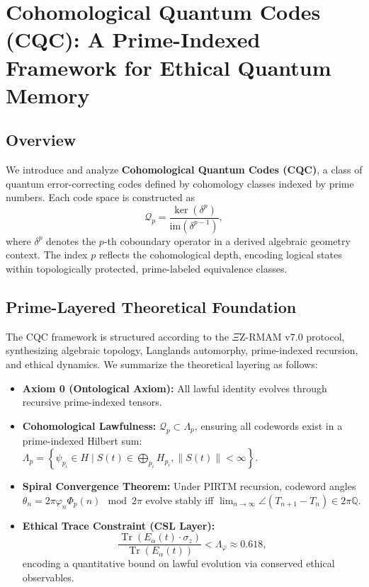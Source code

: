 \documentclass[12]{amsart}
\theoremstyle{plain}
\begin{document}
\section{Cohomological Quantum Codes (CQC): A Prime-Indexed Framework for Ethical Quantum Memory}

\subsection{Overview}
We introduce and analyze \textbf{Cohomological Quantum Codes (CQC)}, a class of quantum error-correcting codes defined by cohomology classes indexed by prime numbers. Each code space is constructed as
\[
\mathcal{Q}_p = \frac{\ker(\delta^p)}{\mathrm{im}(\delta^{p-1})},
\]
where $\delta^p$ denotes the $p$-th coboundary operator in a derived algebraic geometry context. The index $p$ reflects the cohomological depth, encoding logical states within topologically protected, prime-labeled equivalence classes.

\subsection{Prime-Layered Theoretical Foundation}
The CQC framework is structured according to the $\Xi$Z-RMAM v7.0 protocol, synthesizing algebraic topology, Langlands automorphy, prime-indexed recursion, and ethical dynamics. We summarize the theoretical layering as follows:

\begin{itemize}
    \item \textbf{Axiom 0 (Ontological Axiom):} All lawful identity evolves through recursive prime-indexed tensors.
    \item \textbf{Cohomological Lawfulness:} $\mathcal{Q}_p \subset \Lambda_p$, ensuring all codewords exist in a prime-indexed Hilbert sum: $\Lambda_p = \left\{ \psi_{p_i} \in H \mid S(t) \in \bigoplus_{p_i} H_{p_i}, \|S(t)\| < \infty \right\}$.
    \item \textbf{Spiral Convergence Theorem:} Under PIRTM recursion, codeword angles $\theta_n = 2\pi \varphi_n \Phi_p(n) \mod 2\pi$ evolve stably iff $\lim_{n \to \infty} \angle(T_{n+1} - T_n) \in 2\pi \mathbb{Q}$.
    \item \textbf{Ethical Trace Constraint (CSL Layer):}
    \[
    \frac{\operatorname{Tr}(E_\alpha(t) \cdot \sigma_z)}{\operatorname{Tr}(E_\alpha(t))} < \Lambda_\varphi \approx 0.618,
    \]
    encoding a quantitative bound on lawful evolution via conserved ethical observables.
\end{itemize}
\end{document}
